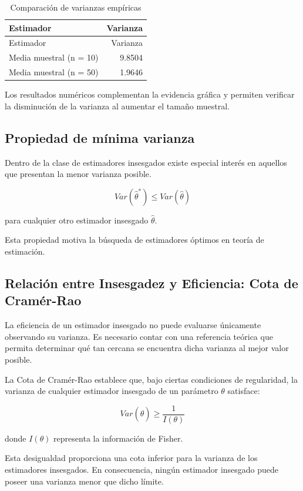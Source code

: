 \documentclass[
  11pt,
]{report}
\begin{document}
\begin{longtable}[]{@{}lr@{}}
\caption{Comparación de varianzas empíricas}\tabularnewline
\toprule\noalign{}
Estimador & Varianza \\
\midrule\noalign{}
\endfirsthead
\toprule\noalign{}
Estimador & Varianza \\
\midrule\noalign{}
\endhead
\bottomrule\noalign{}
\endlastfoot
Media muestral (n = 10) & 9.8504 \\
Media muestral (n = 50) & 1.9646 \\
\end{longtable}

Los resultados numéricos complementan la evidencia gráfica y permiten
verificar la disminución de la varianza al aumentar el tamaño muestral.

\subsection{Propiedad de mínima
varianza}\label{propiedad-de-muxednima-varianza}

Dentro de la clase de estimadores insesgados existe especial interés en
aquellos que presentan la menor varianza posible.

\[Var(\hat{\theta}^{*})
\le
Var(\hat{\theta})\]

para cualquier otro estimador insesgado \(\hat{\theta}\).

Esta propiedad motiva la búsqueda de estimadores óptimos en teoría de
estimación.

\subsection{Relación entre Insesgadez y Eficiencia: Cota de
Cramér-Rao}\label{relaciuxf3n-entre-insesgadez-y-eficiencia-cota-de-cramuxe9r-rao}

La eficiencia de un estimador insesgado no puede evaluarse únicamente
observando su varianza. Es necesario contar con una referencia teórica
que permita determinar qué tan cercana se encuentra dicha varianza al
mejor valor posible.

La Cota de Cramér-Rao establece que, bajo ciertas condiciones de
regularidad, la varianza de cualquier estimador insesgado de un
parámetro \(\theta\) satisface:

\[Var(\hat{\theta})
\ge
\frac{1}{I(\theta)}\]

donde \(I(\theta)\) representa la información de Fisher.

Esta desigualdad proporciona una cota inferior para la varianza de los
estimadores insesgados. En consecuencia, ningún estimador insesgado
puede poseer una varianza menor que dicho límite.
\end{document}

